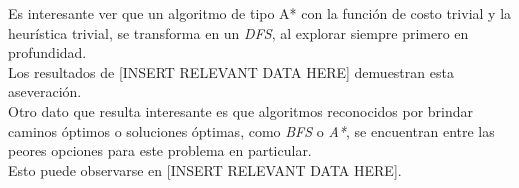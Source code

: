 \documentclass[a4paper,10pt]{article}
\begin{document}
    Es interesante ver que un algoritmo de tipo A* con la función de costo trivial y la heurística trivial, se transforma en un \textit{DFS}, al explorar siempre 
    primero en profundidad. \\

    Los resultados de [INSERT RELEVANT DATA HERE] demuestran esta aseveración. \\

    Otro dato que resulta interesante es que algoritmos reconocidos por brindar caminos óptimos o soluciones óptimas, como \textit{BFS} o \textit{A*}, se encuentran entre las peores
    opciones para este problema en particular. \\

    Esto puede observarse en [INSERT RELEVANT DATA HERE].\\


\end{document}
